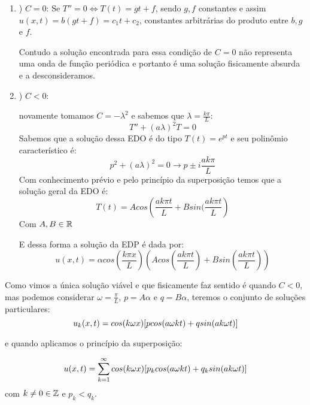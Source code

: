 \begin{enumerate}[I]
    \item) $C = 0$:
    Se $T'' = 0 \Longleftrightarrow T(t) = gt + f$, sendo $g, f$ constantes e assim $u(x, t) = b(gt + f) = c_1t + c_2$, constantes arbitrárias do produto entre $b, g$ e $f$.
    
    Contudo a solução encontrada para essa condição de $C=0$ não representa uma onda de função periódica e portanto é uma solução fisicamente absurda e a desconsideramos.
    \item) $C < 0$:
    
    novamente tomamos $C = -\lambda^2$ e sabemos que $\lambda = \frac{k\pi}{L}$:
    \begin{equation*}
        T'' + (a\lambda)^2T = 0
    \end{equation*}
    Sabemos que a solução dessa EDO é do tipo $T(t) = e^{pt}$ e seu polinômio característico é:
    \begin{equation*}
        p^2 + (a\lambda)^2 = 0 \longrightarrow p \pm i\frac{ak\pi}{L}
    \end{equation*}
    Com conhecimento prévio e pelo princípio da superposição temos que a solução geral da EDO é:
    \begin{equation*}
        T(t) = Acos\left(\frac{ak\pi t}{L} + Bsin(\frac{ak\pi t}{L}\right)
    \end{equation*}
    Com $A,B\in\mathbb{R}$
    
    E dessa forma a solução da EDP é dada por:
    \begin{equation*}
        u(x, t) = \alpha cos\left(\frac{k\pi x}{L}\right)\left(Acos\left(\frac{ak\pi t}{L}\right) + Bsin\left(\frac{ak\pi t}{L}\right)\right)
    \end{equation*}
\end{enumerate}

Como vimos a única solução viável e que fisicamente faz sentido é quando $C<0$, mas podemos considerar $\omega = \frac{\pi}{L}$, $p = A\alpha$ e $q = B\alpha$, teremos o conjunto de soluções particulares:
\begin{equation*}
    u_k(x, t) = cos(k\omega x)[pcos(a\omega kt) + qsin(ak\omega t)]
\end{equation*}

e quando aplicamos o princípio da superposição:

\begin{equation*}
    u(x, t) = \sum_{k=1}^\infty cos(k\omega x)[p_kcos(a\omega kt) + q_ksin(ak\omega t)]
\end{equation*}
com $k\neq0\in\mathbb{Z}$  e $p_k < q_k$. 

